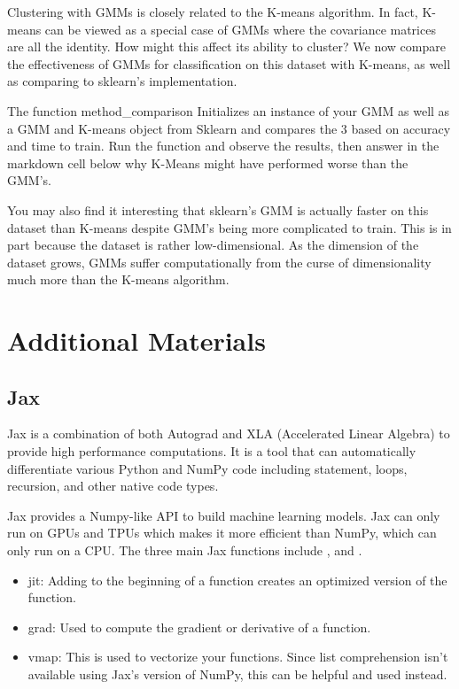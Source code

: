Clustering with GMMs is closely related to the K-means algorithm.
In fact, K-means can be viewed as a special case of GMMs where the covariance matrices are all the identity. How might this affect its ability to cluster?
We now compare the effectiveness of GMMs for classification on this dataset with K-means, as well as comparing to sklearn's implementation.

\begin{problem}
The function method\_comparison Initializes an instance of your GMM as well as a GMM and K-means object  from Sklearn and compares the 3 based on accuracy and time
to train. Run the function and observe the results, then answer in the markdown cell below why K-Means might have performed worse than the GMM's.
\end{problem}

You may also find it interesting that sklearn's GMM is actually faster on this dataset than K-means despite GMM's being more complicated to train.
This is in part because the dataset is rather low-dimensional.
As the dimension of the dataset grows, GMMs suffer computationally from the curse of dimensionality much more than the K-means algorithm.


\pagebreak

\section*{Additional Materials}

\subsection*{Jax}
Jax is a combination of both Autograd and XLA (Accelerated Linear Algebra) to provide high performance computations. It is a tool that can automatically differentiate various Python and NumPy code including  statement,  loops, recursion, and other native code types.

 Jax provides a Numpy-like API to build machine learning models. Jax can only run on GPUs and TPUs which makes it more efficient than NumPy, which can only run on a CPU. The three main Jax functions include ,  and .

\begin{itemize}
 \item jit: Adding   to the beginning of a function creates an optimized version of the function.
\item grad: Used to compute the gradient or derivative of a function.
\item vmap: This is used to vectorize your functions. Since list comprehension isn't available using Jax's version of NumPy, this can be helpful and used instead.
\end{itemize}

